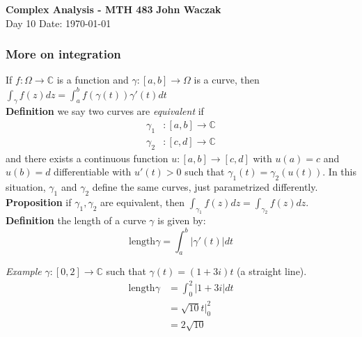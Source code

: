 \documentclass[a4paper, 11pt]{article}
\begin{document}
\noindent
\large\textbf{Complex Analysis - MTH 483} \hfill \textbf{John Waczak} \\
\normalsize Day 10 \hfill  Date: \today \\

\subsubsection*{More on integration}
If $f:\Omega \rightarrow \mathbb{C}$ is a function and $\gamma:[a,b]\rightarrow\Omega$ is a curve, then $\int_\gamma f(z)dz = \int_a^b f(\gamma(t))\gamma'(t)dt$\\

\noindent \textbf{Definition} we say two curves are \textit{equivalent} if
	\begin{align*}
		\gamma_1&:[a,b]\rightarrow\mathbb{C} \\ 
		\gamma_2&:[c,d]\rightarrow\mathbb{C} 
	\end{align*}
and there exists a continuous function $u:[a,b]\rightarrow[c,d]$ with $u(a)=c$ and $u(b)=d$ differentiable with $u'(t)>0$ such that $\gamma_1(t) = \gamma_2(u(t))$. In this situation, $\gamma_1$ and $\gamma_2$ define the same curves, just parametrized differently. \\

\noindent \textbf{Proposition} if $\gamma_1, \gamma_2$ are equivalent, then $\int_{\gamma_1}f(z)dz = \int_{\gamma_2}f(z)dz$. \\

\noindent \textbf{Definition} the length of a curve $\gamma$ is given by: 
	\begin{equation*}
		\text{length}\gamma = \int_a^b |\gamma'(t)|dt
	\end{equation*}

\noindent \textit{Example} 
	$\gamma:[0,2]\rightarrow\mathbb{C}$ such that $\gamma(t) = (1+3i)t$ (a straight line). 
		\begin{align*}
			\text{length}\gamma &= \int_0^2 |1+3i|dt \\ 
				&= \sqrt{10}t\Big|_0^2 \\ 
				&= 2\sqrt{10} 
		\end{align*}
\end{document}
